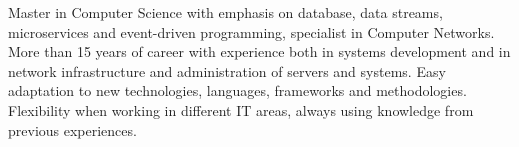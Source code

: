 

\begin{cvparagraph}

Master in Computer Science with emphasis on database, data streams, microservices and event-driven programming, specialist in Computer Networks. More than 15 years of career with experience both in systems development and in network infrastructure and administration of servers and systems. Easy adaptation to new technologies, languages, frameworks and methodologies. Flexibility when working in different IT areas, always using knowledge from previous experiences.

\end{cvparagraph}
